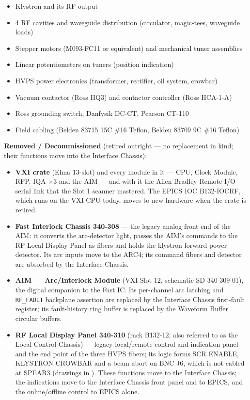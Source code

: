{\begin{itemize}
\tightlist
\item
  Klystron and its RF output
\item
  4 RF cavities and waveguide distribution (circulator, magic-tees, waveguide loads)
\item
  Stepper motors (M093-FC11 or equivalent) and mechanical tuner assemblies
\item
  Linear potentiometers on tuners (position indication)
\item
  HVPS power electronics (transformer, rectifier, oil system, crowbar)
\item
  Vacuum contactor (Ross HQ3) and contactor controller (Ross HCA-1-A)
\item
  Ross grounding switch, Danfysik DC-CT, Pearson CT-110
\item
  Field cabling (Belden 83715 15C \#16 Teflon, Belden 83709 9C \#16 Teflon)
\end{itemize}

\noindent\textbf{Removed / Decommissioned} (retired outright --- no replacement in kind; their functions move into the Interface Chassis):

\begin{itemize}
\tightlist
\item
  \textbf{VXI crate} (Elma 13-slot) and every module in it --- CPU, Clock Module, RFP, IQA $\times$3 and the AIM --- and with it the Allen-Bradley Remote I/O serial link that the Slot 1 scanner mastered. The EPICS IOC \mbox{B132-IOCRF}, which runs on the VXI CPU today, moves to new hardware when the crate is retired.
\item
  \textbf{Fast Interlock Chassis 340-308} --- the legacy analog front end of the AIM: it converts the arc-detector light, passes the AIM's commands to the RF Local Display Panel as fibers and holds the klystron forward-power detector. Its arc inputs move to the ARC4; its command fibers and detector are absorbed by the Interface Chassis.
\item
  \textbf{AIM --- Arc/Interlock Module} (VXI Slot 12, schematic SD-340-309-01), the digital companion to the Fast IC. Its per-channel arc latching and \texttt{RF\_FAULT} backplane assertion are replaced by the Interface Chassis first-fault register; its fault-history ring buffer is replaced by the Waveform Buffer circular buffers.
\item
  \textbf{RF Local Display Panel 340-310} (rack B132-12; also referred to as the Local Control Chassis) --- legacy local/remote control and indication panel and the end point of the three HVPS fibers; its logic forms SCR ENABLE, KLYSTRON CROWBAR and a beam abort on BNC J6, which is not cabled at SPEAR3 (drawings in ). These functions move to the Interface Chassis; the indications move to the Interface Chassis front panel and to EPICS, and the online/offline control to EPICS alone.
\end{itemize}

}
